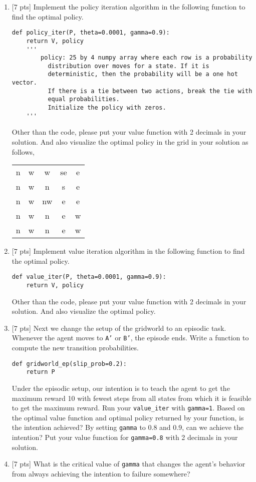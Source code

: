 \begin{enumerate}
    \item{}[7 pts] Implement the policy iteration algorithm in the following
    function to find the optimal policy.
    \begin{verbatim}
def policy_iter(P, theta=0.0001, gamma=0.9):
    return V, policy
    '''
        policy: 25 by 4 numpy array where each row is a probability
          distribution over moves for a state. If it is
          deterministic, then the probability will be a one hot vector.
          If there is a tie between two actions, break the tie with
          equal probabilities.
          Initialize the policy with zeros.
    '''
    \end{verbatim}
    Other than the code, please put your value function with 2 decimals
    in your solution. And also visualize the optimal policy in
    the grid in your solution as follows,
    \begin{tabular}{ccccc}
      n & w & w & se & e \\
      n & w & n & s & e \\
      n & w & nw & e & e \\
      n & w & n & e & w \\
      n & w & n & e & w \\
    \end{tabular}

    \item{}[7 pts] Implement value iteration algorithm in the following
    function to find the optimal policy.
    \begin{verbatim}
def value_iter(P, theta=0.0001, gamma=0.9):
    return V, policy
    \end{verbatim}
    Other than the code, please put your value function with 2 decimals
    in your solution. And also visualize the optimal policy.

    \item{}[7 pts] Next we change the setup of the gridworld to an episodic task.
    Whenever the agent moves to \texttt{A'} or \texttt{B'}, the episode ends.
    Write a function to compute the new transition probabilities.
    \begin{verbatim}
def gridworld_ep(slip_prob=0.2):
    return P
    \end{verbatim}
    Under the episodic setup, our intention is to teach the agent to get the
    maximum reward 10 with fewest steps from all states from which it is
    feasible to get the maximum reward. Run your \texttt{value\_iter} with
    \texttt{gamma=1}. Based on the optimal value function and optimal policy returned by your
    function, is the intention achieved?
    By setting \texttt{gamma} to 0.8 and 0.9, can we achieve the intention?
    Put your value function for \texttt{gamma=0.8} with 2 decimals in your
    solution.

    \item{}[7 pts] What is the critical value of \texttt{gamma} that changes the agent's 
    behavior from always achieving the intention to failure somewhere? 
\end{enumerate}
